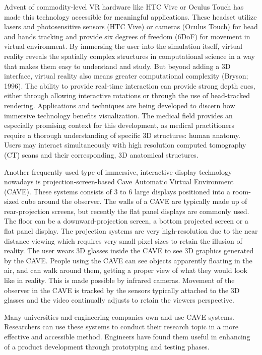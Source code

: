 Advent of commodity-level VR hardware like HTC Vive or Oculus Touch has made this technology accessible for meaningful applications. These headset utilize lasers and photosensitive sensors (HTC Vive) or cameras (Oculus Touch) for head and hands tracking and provide six degrees of freedom (6DoF) for movement in virtual environment. By immersing the user into the simulation itself, virtual reality reveals the spatially complex structures in computational science in a way that makes them easy to understand and study. But beyond adding a 3D interface, virtual reality also means greater computational complexity (Bryson; 1996). The ability to provide real-time interaction can provide strong depth cues, either through allowing interactive rotations or through the use of head-tracked rendering. Applications and techniques are being developed to discern how immersive technology benefits visualization. The medical field provides an especially promising context for this development, as medical practitioners require a thorough understanding of specific 3D structures: human anatomy. Users may interact simultaneously with high resolution computed tomography (CT) scans and their corresponding, 3D anatomical structures.

Another frequently used type of immersive, interactive display technology nowadays is projection-screen-based Cave Automatic Virtual Environment (CAVE). These systems consists of 3 to 6 large displays positioned into a room-sized cube around the observer. The walls of a CAVE are typically made up of rear-projection screens, but recently the flat panel displays are commonly used. The floor can be a downward-projection screen, a bottom projected screen or a flat panel display. The projection systems are very high-resolution due to the near distance viewing which requires very small pixel sizes to retain the illusion of reality. The user wears 3D glasses inside the CAVE to see 3D graphics generated by the CAVE. People using the CAVE can see objects apparently floating in the air, and can walk around them, getting a proper view of what they would look like in reality. This is made possible by infrared cameras. Movement of the observer in the CAVE is tracked by the sensors typically attached to the 3D glasses and the video continually adjusts to retain the viewers perspective.

Many universities and engineering companies own and use CAVE systems. Researchers can use these systems to conduct their research topic in a more effective and accessible method. Engineers have found them useful in enhancing of a product development through prototyping and testing phases.

